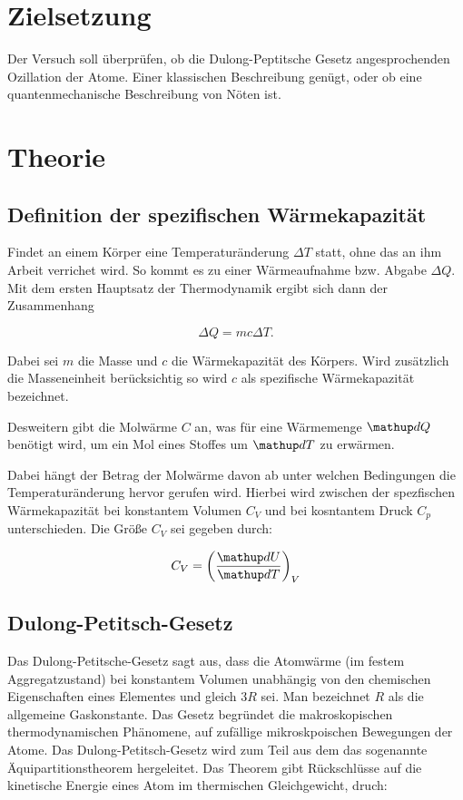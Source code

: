 \section*{Zielsetzung}
Der Versuch soll überprüfen, ob die Dulong-Peptitsche Gesetz
angesprochenden Ozillation der Atome. Einer klassischen Beschreibung genügt,
oder ob eine quantenmechanische Beschreibung von Nöten ist.


\section{Theorie}

\subsection{Definition der spezifischen Wärmekapazität}

Findet an einem Körper eine Temperaturänderung $\Delta T$ statt, ohne das an ihm 
Arbeit verrichet wird. So kommt es zu einer Wärmeaufnahme bzw. Abgabe $\Delta Q$.
Mit dem ersten Hauptsatz der Thermodynamik ergibt sich dann der Zusammenhang

\begin{equation*}
\Delta Q=m c \Delta T.
\end{equation*}

Dabei sei $m$ die Masse und $c$ die Wärmekapazität 
des Körpers.
Wird zusätzlich die Masseneinheit berücksichtig
so wird $c$ als spezifische Wärmekapazität bezeichnet.

Desweitern gibt die Molwärme $C$
an, was für eine Wärmemenge $\map{d}Q$ benötigt wird,
um ein Mol eines Stoffes um $\map{d}T$ zu erwärmen.

Dabei hängt der Betrag der Molwärme  davon ab unter welchen Bedingungen 
die Temperaturänderung hervor gerufen wird.
Hierbei wird zwischen der spezfischen Wärmekapazität bei konstantem
Volumen $C_{V}$ und bei kosntantem Druck $C_{p}$ unterschieden.
Die Größe $C_{V}$ sei gegeben durch:

\begin{equation}
\label{eq:molwarme}
C_V=\left(\frac{\map{d}U}{\map{d}T}\right)_V
\end{equation}


\subsection{Dulong-Petitsch-Gesetz}

Das Dulong-Petitsche-Gesetz sagt aus, dass die Atomwärme (im festem Aggregatzustand) bei 
konstantem Volumen unabhängig von den chemischen Eigenschaften eines Elementes 
und gleich $3R$ sei.
Man bezeichnet $R$ als die allgemeine Gaskonstante.
Das Gesetz begründet die makroskopischen thermodynamischen Phänomene, 
auf zufällige mikroskpoischen Bewegungen der Atome.
Das Dulong-Petitsch-Gesetz wird zum Teil aus dem 
das sogenannte Äquipartitionstheorem hergeleitet. 
Das Theorem gibt Rückschlüsse auf die kinetische Energie eines Atom
im thermischen Gleichgewicht, druch:

